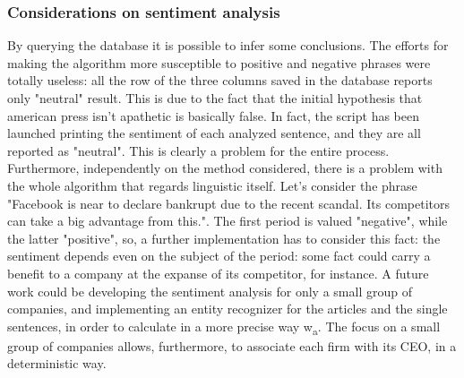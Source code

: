 \subsubsection{Considerations on sentiment analysis}
By querying the database it is possible to infer some conclusions. The efforts for making the algorithm more susceptible to positive and negative phrases were totally useless: all the row of the three columns saved in the database reports only "neutral" result. This is due to the fact that the initial hypothesis that american press isn't apathetic is basically false. In fact, the script has been launched printing the sentiment of each analyzed sentence, and they are all reported as "neutral". This is clearly a problem for the entire process. \\
Furthermore, independently on the method considered, there is a problem with the whole algorithm that regards linguistic itself. Let's consider the phrase "Facebook is near to declare bankrupt due to the recent scandal. Its competitors can take a big advantage from this.". The first period is valued "negative", while the latter "positive", so, a further implementation has to consider this fact: the sentiment depends even on the subject of the period: some fact could carry a benefit to a company at the expanse of its competitor, for instance. A future work could be developing the sentiment analysis for only a small group of companies, and implementing an entity recognizer for the articles and the single sentences, in order to calculate in a more precise way w\textsubscript{a}. The focus on a small group of companies allows, furthermore, to associate each firm with its CEO, in a deterministic way.  